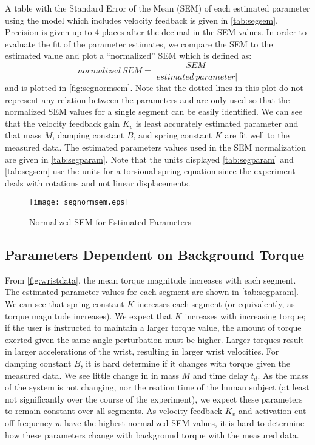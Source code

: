 \documentclass[11pt,a4paper]{article}
\begin{document}
A table with the Standard Error of the Mean (SEM) of each estimated parameter
using the model which includes velocity feedback is given in
\autoref{tab:segsem}.  Precision is given up to 4 places after the decimal in
the SEM values. In order to evaluate the fit of the parameter estimates, we
compare the SEM to the estimated value and plot a ``normalized'' SEM  which is
defined as:
\begin{equation*}
    normalized \: SEM = \frac{SEM}{|estimated \: parameter|}
\end{equation*}
and is plotted in \autoref{fig:segnormsem}. Note that the dotted lines in this
plot do not represent any relation between the parameters and are only used so
that the normalized SEM values for a single segment can be easily identified.
We can see that the velocity feedback gain $K_v$ is least accurately estimated
parameter and that mass $M$, damping constant $B$, and spring constant $K$ are
fit well to the measured data. The estimated parameters values used in the SEM
normalization are given in \autoref{tab:segparam}. Note that the units
displayed \autoref{tab:segparam} and \autoref{tab:segsem} use the units for a
torsional spring equation since the experiment deals with rotations and not
linear displacements.

\begin{figure}
    \centering
    \texttt{[image: segnormsem.eps]}
    \caption{Normalized SEM for Estimated Parameters}
    \label{fig:segnormsem}
\end{figure}


\subsection{Parameters Dependent on Background Torque}
From \autoref{fig:wristdata}, the mean torque magnitude increases with each
segment. The estimated parameter values for each segment are shown in
\autoref{tab:segparam}. We can see that spring constant $K$ increases each
segment (or equivalently, as torque magnitude increases). We expect that $K$
increases with increasing torque; if the user is instructed to maintain a
larger torque value, the amount of torque exerted given the same angle
perturbation must be higher. Larger torques result in larger accelerations of
the wrist, resulting in larger wrist velocities. For damping constant $B$, it
is hard determine if it changes with torque given the measured data. We see
little change in in mass $M$ and time delay $t_d$. As the mass of the system is
not changing, nor the reation time of the human subject (at least not
significantly over the course of the experiment), we expect these parameters to
remain constant over all segments. As velocity feedback $K_v$ and activation
cut-off frequency $w$ have the highest normalized SEM values, it is hard to
determine how these parameters change with background torque with the measured
data.
\end{document}

